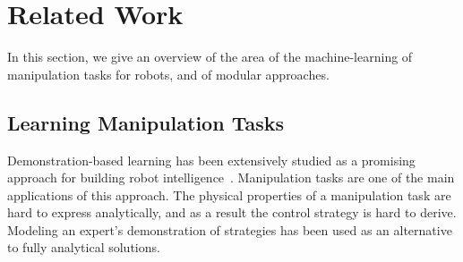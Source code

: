 \section{Related Work}
\label{sec:related}
In this section, we give an overview of the area of the
machine-learning of manipulation tasks for robots, and of modular
approaches.



\subsection{Learning Manipulation Tasks}
Demonstration-based learning has been extensively
studied
as a promising approach for building robot
intelligence~\citep{calinon2007learning,dillmann2004teaching,kulic2012incremental}. %
Manipulation tasks are one of the main applications of this
approach. The physical properties of a manipulation task are hard to
express analytically, and as a result the control strategy is hard to derive. Modeling an expert's demonstration
of strategies has been used as an alternative to fully analytical
solutions.

